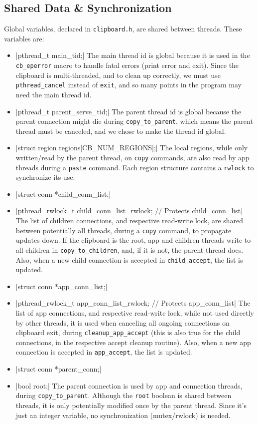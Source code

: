 \documentclass[a4paper, titlepage, english]{article}
\begin{document}
	\subsection{Shared Data \& Synchronization}
	\par
	Global variables, declared in \texttt{clipboard.h}, are shared between threads. These variables are:
	\begin{itemize}
		\item {}|pthread_t main_tid;|
		The main thread id is global because it is used in the \texttt{cb\_eperror} macro to handle fatal errors (print error and exit). Since the clipboard is multi-threaded, and to clean up correctly, we must use \texttt{pthread\_cancel} instead of \texttt{exit}, and so many points in the program may need the main thread id.
		\item {}|pthread_t parent_serve_tid;|
		The parent thread id is global because the parent connection might die during \texttt{copy\_to\_parent}, which means the parent thread must be canceled, and we chose to make the thread id global.
		\item {}|struct region regions[CB_NUM_REGIONS];|
		The local regions, while only written/read by the parent thread, on \texttt{copy} commands, are also read by app threads during a \texttt{paste} command. Each region structure contains a \texttt{rwlock} to synchronize its use.
		\item {}|struct conn *child_conn_list;|
		\item {}|pthread_rwlock_t child_conn_list_rwlock; // Protects child_conn_list|
		The list of children connections, and respective read-write lock, are shared between potentially all threads, during a \texttt{copy} command, to propagate updates down. If the clipboard is the root, app and children threads write to all children in \texttt{copy\_to\_children}, and, if it is not, the parent thread does. Also, when a new child connection is accepted in \texttt{child\_accept}, the list is updated.
		\item {}|struct conn *app_conn_list;|
		\item {}|pthread_rwlock_t app_conn_list_rwlock; // Protects app_conn_list|
		The list of app connections, and respective read-write lock, while not used directly by other threads, it is used when canceling all ongoing connections on clipboard exit, during \texttt{cleanup\_app\_accept} (this is also true for the child connections, in the respective accept cleanup routine). Also, when a new app connection is accepted in \texttt{app\_accept}, the list is updated.
		\item {}|struct conn *parent_conn;|
		\item {}|bool root;|
		The parent connection is used by app and connection threads, during \texttt{copy\_to\_parent}. Although the \texttt{root} boolean is shared between threads, it is only potentially modified once by the parent thread. Since it's just an integer variable, no synchronization (mutex/rwlock) is needed.
	\end{itemize}
\end{document}
